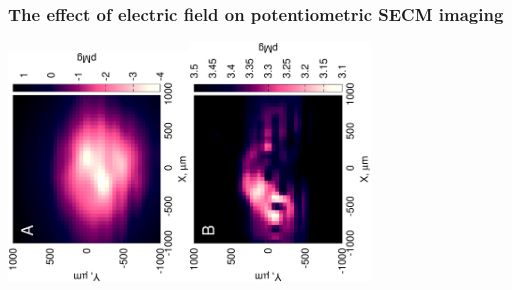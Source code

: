 \documentclass{beamer}
\begin{document}
\begin{frame}
\frametitle{The effect of electric field on potentiometric SECM imaging}
\centering
\includegraphics[trim = 10mm 20mm 0mm 10mm, clip, width=0.36\textwidth, angle=-90]{17012501.eps}\includegraphics[trim = 10mm 20mm 0mm 10mm, clip, width=0.36\textwidth, angle=-90]{17012503_deconvoluted.eps}
\end{frame}
\end{document}
